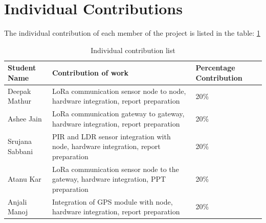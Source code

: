 \documentclass[11pt, oneside]{article}   	%
\begin{document}
\section{Individual Contributions}
The individual contribution of each member of the project is listed in the table: \ref{tab: contribution}
\begin{table}[h]
\begin{center}
\begin{tabular}{ | m{8em} | m{22em}| m{6em} |} 

  \hline
  \textbf {Student Name} & \textbf{Contribution of work}  & \textbf {Percentage Contribution} \\
    \hline
    Deepak Mathur & LoRa communication sensor node to node, hardware integration, report preparation & 20\%\\
    \hline        
    Ashee Jain &  LoRa communication gateway to gateway, hardware integration, report preparation & 20\%\\
    \hline
    Srujana Sabbani & PIR and LDR sensor integration with node, hardware integration, report preparation & 20\%\\
    \hline
    Atanu Kar & LoRa communication sensor node to the gateway, hardware integration, PPT preparation & 20\%\\
    \hline
    Anjali Manoj & Integration of GPS module with node, hardware integration, report preparation & 20\%\\
    \hline
    \end{tabular}
    \caption{Individual contribution list}
    \label{tab: contribution}
\end{center}
\end{table}

 

\end{document}

